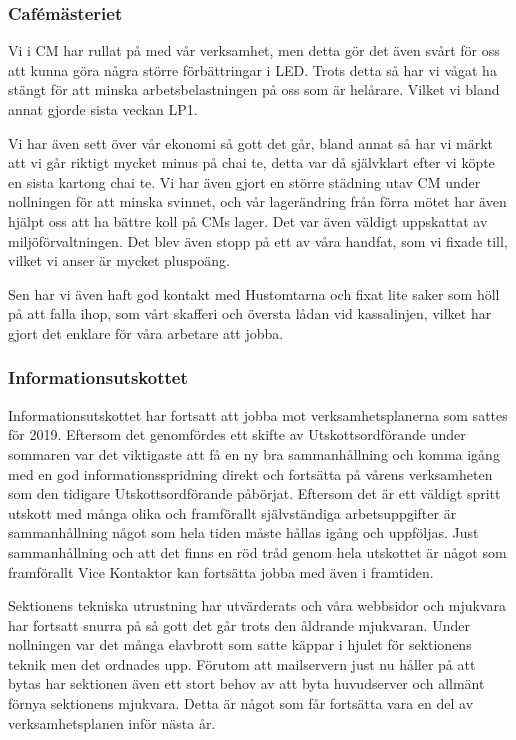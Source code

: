 \documentclass[../_main/handlingar.tex]{subfiles}
\begin{document}
\subsubsection*{Cafémästeriet}

Vi i CM har rullat på med vår verksamhet, men detta gör det även svårt för oss att kunna göra några större förbättringar i LED. Trots detta så har vi vågat ha stängt för att minska arbetsbelastningen på oss som är helårare. Vilket vi bland annat gjorde sista veckan LP1. 

Vi har även sett över vår ekonomi så gott det går, bland annat så har vi märkt att vi går riktigt mycket minus på chai te, detta var då självklart efter vi köpte en sista kartong chai te. Vi har även gjort en större städning utav CM under nollningen för att minska svinnet, och vår lagerändring från förra mötet har även hjälpt oss att ha bättre koll på CMs lager. Det var även väldigt uppskattat av miljöförvaltningen. Det blev även stopp på ett av våra handfat, som vi fixade till, vilket vi anser är mycket pluspoäng. 

Sen har vi även haft god kontakt med Hustomtarna och fixat lite saker som höll på att falla ihop, som vårt skafferi och översta lådan vid kassalinjen, vilket har gjort det enklare för våra arbetare att jobba.

\subsubsection*{Informationsutskottet}

Informationsutskottet har fortsatt att jobba mot verksamhetsplanerna som sattes för 2019. Eftersom det genomfördes ett skifte av Utskottsordförande under sommaren var det viktigaste att få en ny bra sammanhållning och komma igång med en god informationsspridning direkt och fortsätta på vårens verksamheten som den tidigare Utskottsordförande påbörjat. Eftersom det är ett väldigt spritt utskott med många olika och framförallt självständiga arbetsuppgifter är sammanhållning något som hela tiden måste hållas igång och uppföljas. Just sammanhållning och att det finns en röd tråd genom hela utskottet är något som framförallt Vice Kontaktor kan fortsätta jobba med även i framtiden. 

Sektionens tekniska utrustning har utvärderats och våra webbsidor och mjukvara har fortsatt snurra på så gott det går trots den åldrande mjukvaran. Under nollningen var det många elavbrott som satte käppar i hjulet för sektionens teknik men det ordnades upp. Förutom att mailservern just nu håller på att bytas har sektionen även ett stort behov av att byta huvudserver och allmänt förnya sektionens mjukvara. Detta är något som får fortsätta vara en del av verksamhetsplanen inför nästa år.
\end{document}

